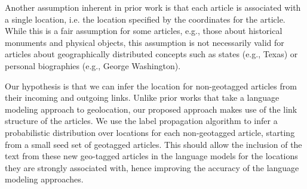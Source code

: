 \par Another assumption inherent in prior work is that each article is
associated with a single location, i.e. the location specified by the
coordinates for the article. While this is a fair assumption for some
articles, e.g., those about historical monuments and physical objects, this
assumption is not necessarily valid for articles about geographically
distributed concepts such as states (e.g., Texas) or personal biographies
(e.g., George Washington).

\par Our hypothesis is that we can infer the location for non-geotagged
articles from their incoming and outgoing links. Unlike prior works that take
a language modeling approach to geolocation, our proposed approach makes use
of the link structure of the articles. We use the label propagation algorithm
to infer a probabilistic distribution over locations for each non-geotagged
article, starting from a small seed set of geotagged articles. This should
allow the inclusion of the text from these new geo-tagged articles in the
language models for the locations they are strongly associated with, hence
improving the accuracy of the language modeling approaches.


